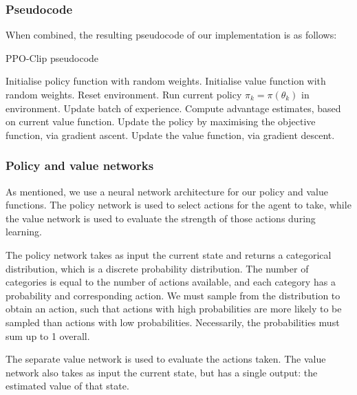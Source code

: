 \documentclass[12pt,a4paper]{article}
\begin{document}
\subsubsection{Pseudocode}
When combined, the resulting pseudocode of our implementation is as follows:

\begin{algorithm}[h]
    \caption{PPO-Clip pseudocode}
    \label{alg1}
\begin{algorithmic}[1]
    \STATE Initialise policy function with random weights.
    \STATE Initialise value function with random weights.
    \STATE Reset environment.
    \STATE Run current policy $\pi_k = \pi(\theta_k)$ in environment.
    \STATE Update batch of experience.
    \ENDFOR
    \STATE Compute advantage estimates, based on current value function.
    \STATE Update the policy by maximising the objective function, via gradient ascent.
    \STATE Update the value function, via gradient descent. 
    \ENDWHILE
    \ENDFOR
\end{algorithmic}
\end{algorithm}

\subsubsection{Policy and value networks}
As mentioned, we use a neural network architecture for our policy and value functions. The policy network is used to select actions for the agent to take, while the value network is used to evaluate the strength of those actions during learning. 

The policy network takes as input the current state and returns a categorical distribution, which is a discrete probability distribution. The number of categories is equal to the number of actions available, and each category has a probability and corresponding action. We must sample from the distribution to obtain an action, such that actions with high probabilities are more likely to be sampled than actions with low probabilities. Necessarily, the probabilities must sum up to 1 overall. 

The separate value network is used to evaluate the actions taken. The value network also takes as input the current state, but has a single output: the estimated value of that state. 
\end{document}
